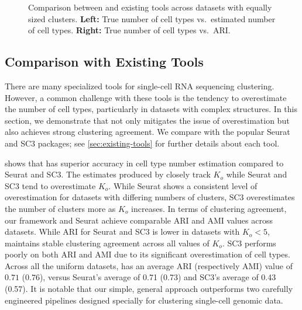 \begin{figure}[t!]
	\centering
	\caption{Comparison between \methodname and existing tools across datasets with equally
		sized clusters.
		\textbf{Left:} True number of cell types vs.\ estimated number of cell types.
		\textbf{Right:}  True number of cell types vs.\ ARI.
	}
	\label{fig:tool_comp_unif}
\end{figure}

\subsection{Comparison with Existing Tools}

There are many specialized tools for single-cell RNA sequencing clustering.
However, a common challenge with these tools is the tendency to overestimate the number of cell types, particularly in datasets with complex structures. In this section, we demonstrate that \methodname not only mitigates the issue of overestimation but also achieves strong clustering agreement. We compare \methodname with the popular Seurat  \citep{seurat} and SC3  \citep[Single-Cell Consensus Clustering;][]{sc3} packages; see \cref{sec:existing-tools} for further details about each tool.

 shows that \methodname has superior accuracy in cell type number estimation compared to Seurat and SC3. The estimates produced by \methodname closely track $K_o$ while Seurat and SC3 tend to overestimate $K_o$.
While Seurat shows a consistent level of overestimation for datasets with differing numbers of clusters,
SC3 overestimates the number of clusters more as $K_o$ increases.
%
In terms of clustering agreement, our framework and Seurat achieve comparable ARI and AMI values across datasets.
While ARI for Seurat and SC3 is lower in datasets with $K_{o} < 5$,
\methodname maintains stable clustering agreement across all values of $K_o$.
SC3 performs poorly on both ARI and AMI due to its significant overestimation of cell types.
Across all the \textsf{uniform} datasets, \methodname has an average ARI (respectively AMI) value of $0.71$ ($0.76$), versus Seurat's average of 0.71 (0.73) and SC3's average of 0.43 (0.57).
It is notable that our simple, general approach outperforms
two carefully engineered pipelines designed specially for clustering single-cell genomic data.


